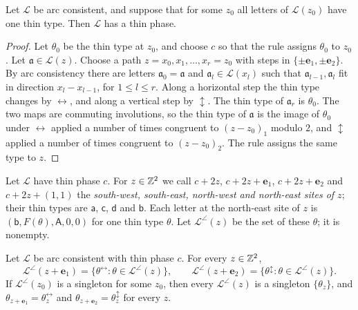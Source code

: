 \begin{lemma}\label{thr:thin}
Let $\mathcal L$ be arc consistent, and suppose that for some $z_0$ all letters of $\mathcal L(z_0)$ have one thin type. Then $\mathcal L$ has a thin phase.
\end{lemma}

\begin{proof}
Let $\theta_0$ be the thin type at $z_0$, and choose $c$ so that the rule assigns $\theta_0$ to $z_0$. Let $\mathfrak a\in\mathcal L(z)$. Choose a path $z=x_0,x_1,\dots,x_r=z_0$ with steps in $\{\pm\mathbf e_1,\pm\mathbf e_2\}$. By arc consistency there are letters $\mathfrak a_0=\mathfrak a$ and $\mathfrak a_l\in\mathcal L(x_l)$ such that $\mathfrak a_{l-1},\mathfrak a_l$ fit in direction $x_l-x_{l-1}$, for $1\le l\le r$. Along a horizontal step the thin type changes by ${\leftrightarrow}$, and along a vertical step by ${\updownarrow}$. The thin type of $\mathfrak a_r$ is $\theta_0$. The two maps are commuting involutions, so the thin type of $\mathfrak a$ is the image of $\theta_0$ under ${\leftrightarrow}$ applied a number of times congruent to $(z-z_0)_1$ modulo $2$, and ${\updownarrow}$ applied a number of times congruent to $(z-z_0)_2$. The rule assigns the same type to $z$.
\end{proof}

Let $\mathcal L$ have thin phase $c$. For $z\in\mathbb{Z}^2$ we call $c+2z$, $c+2z+\mathbf e_1$, $c+2z+\mathbf e_2$ and $c+2z+(1,1)$ the \emph{south-west, south-east, north-west and north-east sites of $z$}; their thin types are $\mathsf a$, $\mathsf c$, $\mathsf d$ and $\mathsf b$. Each letter at the north-east site of $z$ is $(\mathsf b,F(\theta),\mathsf A,0,0)$ for one thin type $\theta$. Let $\mathcal L^{\angle}(z)$ be the set of these $\theta$; it is nonempty.

\begin{lemma}\label{thr:ne}
Let $\mathcal L$ be arc consistent with thin phase $c$. For every $z\in\mathbb{Z}^2$,
\[
\mathcal L^{\angle}(z+\mathbf e_1)=\{\theta^{\leftrightarrow}:\theta\in\mathcal L^{\angle}(z)\},\qquad
\mathcal L^{\angle}(z+\mathbf e_2)=\{\theta^{\updownarrow}:\theta\in\mathcal L^{\angle}(z)\}.
\]
If $\mathcal L^{\angle}(z_0)$ is a singleton for some $z_0$, then every $\mathcal L^{\angle}(z)$ is a singleton $\{\theta_z\}$, and $\theta_{z+\mathbf e_1}=\theta_z^{\leftrightarrow}$ and $\theta_{z+\mathbf e_2}=\theta_z^{\updownarrow}$ for every $z$.
\end{lemma}

